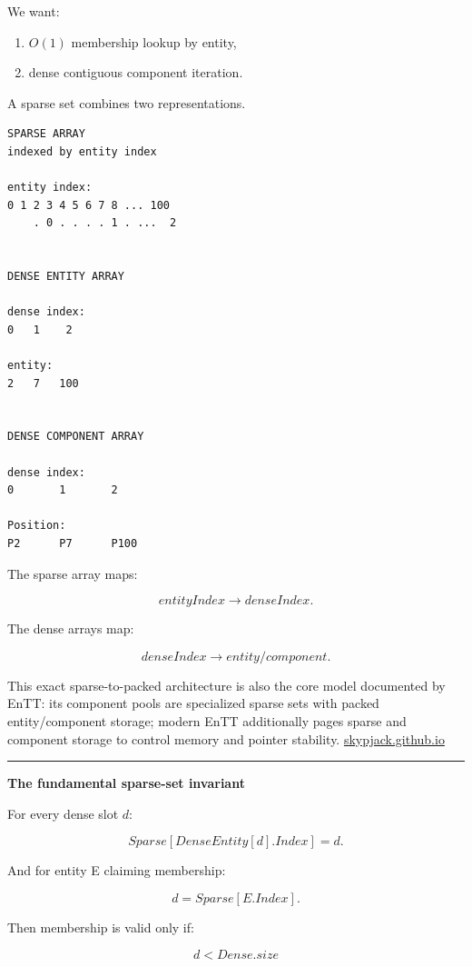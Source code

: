 We want:

\begin{enumerate}
\def\labelenumi{\arabic{enumi}.}
\tightlist
\item
  \(O(1)\) membership lookup by entity,
\item
  dense contiguous component iteration.
\end{enumerate}

A sparse set combines two representations.

\begin{verbatim}
SPARSE ARRAY
indexed by entity index

entity index:
0 1 2 3 4 5 6 7 8 ... 100
    . 0 . . . . 1 . ...  2


DENSE ENTITY ARRAY

dense index:
0   1    2

entity:
2   7   100


DENSE COMPONENT ARRAY

dense index:
0       1       2

Position:
P2      P7      P100
\end{verbatim}

The sparse array maps:

\[
entityIndex\rightarrow denseIndex.
\]

The dense arrays map:

\[
denseIndex\rightarrow entity/component.
\]

This exact sparse-to-packed architecture is also the core model documented by EnTT: its component pools are specialized sparse sets with packed entity/component storage; modern EnTT additionally pages sparse and component storage to control memory and pointer stability. \href{https://skypjack.github.io/entt/md_docs_2md_2entity.html?utm_source=chatgpt.com}{skypjack.github.io}

\begin{center}\rule{0.5\linewidth}{0.5pt}\end{center}

\textbf{The fundamental sparse-set invariant}

For every dense slot \(d\):

\[
\boxed{
Sparse[DenseEntity[d].Index]=d.
}
\]

And for entity E claiming membership:

\[
d=Sparse[E.Index].
\]

Then membership is valid only if:

\[
d<Dense.size
\]

